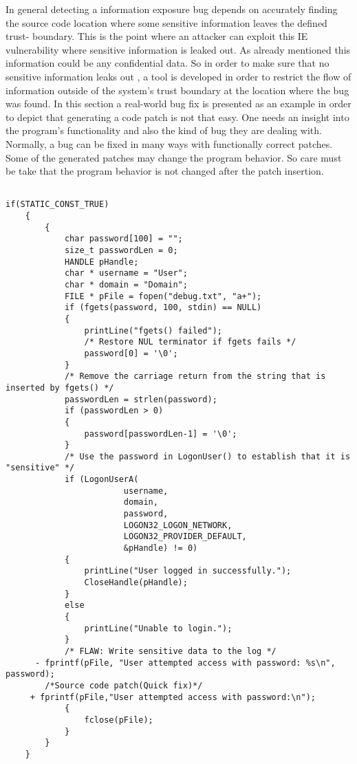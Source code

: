  
 In general detecting a information exposure bug depends on accurately finding the source code location
 where some sensitive information leaves the defined trust- boundary. This is the point where an attacker can exploit this IE vulnerability
 where sensitive information is leaked out. As already mentioned this information could be any confidential data. So in order to make sure that
 no sensitive information leaks out , a tool is developed in order to restrict the flow of information outside of the system's trust boundary at the location where the bug
 was found. In this section a real-world bug fix is presented as an example in order to depict that generating a code patch is not that easy.
 One needs an insight into the program's functionality and also the kind of bug they are dealing with. Normally, a bug can be fixed in many ways with functionally correct patches.
 Some of the generated patches may change the program behavior. So care must be take that the program behavior is not changed after the patch insertion.

\begin{lstlisting}[caption={CWE-534 test programs source},label={lst:CWE534}]

if(STATIC_CONST_TRUE)
    {
        {
            char password[100] = "";
            size_t passwordLen = 0;
            HANDLE pHandle;
            char * username = "User";
            char * domain = "Domain";
            FILE * pFile = fopen("debug.txt", "a+");
            if (fgets(password, 100, stdin) == NULL)
            {
                printLine("fgets() failed");
                /* Restore NUL terminator if fgets fails */
                password[0] = '\0';
            }
            /* Remove the carriage return from the string that is inserted by fgets() */
            passwordLen = strlen(password);
            if (passwordLen > 0)
            {
                password[passwordLen-1] = '\0';
            }
            /* Use the password in LogonUser() to establish that it is "sensitive" */
            if (LogonUserA(
                        username,
                        domain,
                        password,
                        LOGON32_LOGON_NETWORK,
                        LOGON32_PROVIDER_DEFAULT,
                        &pHandle) != 0)
            {
                printLine("User logged in successfully.");
                CloseHandle(pHandle);
            }
            else
            {
                printLine("Unable to login.");
            }
            /* FLAW: Write sensitive data to the log */
      - fprintf(pFile, "User attempted access with password: %s\n", password);
        /*Source code patch(Quick fix)*/
     + fprintf(pFile,"User attempted access with password:\n");
            {
                fclose(pFile);
            }
        }
    }
\end{lstlisting}


